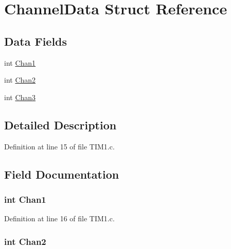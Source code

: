 \hypertarget{struct_channel_data}{}\section{Channel\+Data Struct Reference}
\label{struct_channel_data}
\subsection*{Data Fields}
\begin{DoxyCompactItemize}
\item 
int \hyperlink{struct_channel_data_ac2317f350b1afa35ce7d6e4460bf64f3}{Chan1}
\item 
int \hyperlink{struct_channel_data_a0fadf3a541281c39e672ad11c160fba6}{Chan2}
\item 
int \hyperlink{struct_channel_data_acea010b7f4b1b4e55de85e3a9e65e535}{Chan3}
\end{DoxyCompactItemize}


\subsection{Detailed Description}


Definition at line 15 of file T\+I\+M1.\+c.



\subsection{Field Documentation}
\hypertarget{struct_channel_data_ac2317f350b1afa35ce7d6e4460bf64f3}{}
\subsubsection[{Chan1}]{\setlength{\rightskip}{0pt plus 5cm}int Chan1}\label{struct_channel_data_ac2317f350b1afa35ce7d6e4460bf64f3}


Definition at line 16 of file T\+I\+M1.\+c.

\hypertarget{struct_channel_data_a0fadf3a541281c39e672ad11c160fba6}{}
\subsubsection[{Chan2}]{\setlength{\rightskip}{0pt plus 5cm}int Chan2}\label{struct_channel_data_a0fadf3a541281c39e672ad11c160fba6}


